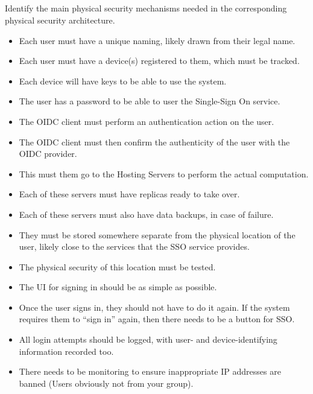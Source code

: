 \begin{questions}
\begin{parts}
  \part{} Identify the main physical security mechanisms needed in the corresponding physical security architecture.
    \begin{solution}
      \begin{itemize}[noitemsep]
      \item Each user must have a unique naming, likely drawn from their legal name.
      \item Each user must have a device(s) registered to them, which must be tracked.
      \item Each device will have keys to be able to use the system.
      \item The user has a password to be able to user the Single-Sign On service.
      \item The OIDC client must perform an authentication action on the user.
      \item The OIDC client must then confirm the authenticity of the user with the OIDC provider.
      \item This must them go to the Hosting Servers to perform the actual computation.
      \item Each of these servers must have replicas ready to take over.
      \item Each of these servers must also have data backups, in case of failure.
      \item They must be stored somewhere separate from the physical location of the user, likely close to the services that the SSO service provides.
      \item The physical security of this location must be tested.
      \item The UI for signing in should be as simple as possible.
      \item Once the user signs in, they should not have to do it again. If the system requires them to ``sign in'' again, then there needs to be a button for SSO.\@
      \item All login attempts should be logged, with user- and device-identifying information recorded too.
      \item There needs to be monitoring to ensure inappropriate IP addresses are banned (Users obviously not from your group).
      \end{itemize}
    \end{solution}


\end{parts}
\end{questions}
